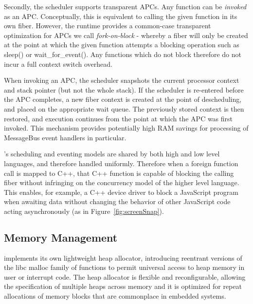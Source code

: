 Secondly, the \CO scheduler supports transparent APCs. Any function can be \emph{invoked} as an APC. Conceptually, this is equivalent to calling the given function in its own fiber. However, the \CO runtime provides a common-case transparent optimization for APCs we call \emph{fork-on-block} - whereby a fiber will only be created at the point at which the given function attempts a blocking operation such as sleep() or wait\_for\_event(). Any functions which do not block therefore do not incur a full context switch overhead.

When invoking an APC, the scheduler snapshots the current processor context and stack pointer (but not the whole stack). If the scheduler is re-entered before the APC completes, a new fiber context is created at the point of descheduling, and placed on the appropriate wait queue. The previously stored context is then restored, and execution continues from the point at which the APC was first invoked. This mechanism provides potentially high RAM savings for processing of MessageBus event handlers in particular.

\CON's scheduling and eventing models are shared by both high and low level languages, and therefore handled uniformly. Therefore when a foreign function call is mapped to C++, that C++ function is capable of blocking the calling fiber without infringing on the concurrency model of the higher level language. This enables, for example, a C++ device driver to block a JavaScript program when awaiting data without changing the behavior of other JavaScript code acting asynchronously (as in Figure~\ref{fig:screenSnap}).


\subsection{Memory Management}
\CO implements its own lightweight heap allocator, introducing reentrant versions of the libc malloc family of functions to permit universal access to heap memory in user or interrupt code. The heap allocator is flexible and reconfigurable, allowing the specification of multiple heaps across memory and it is optimized for repeat allocations of memory blocks that are commonplace in embedded systems.

